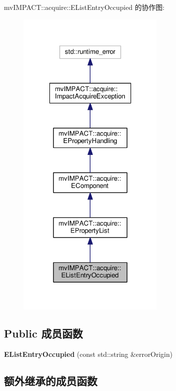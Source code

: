mv\+I\+M\+P\+A\+C\+T\+:\+:acquire\+:\+:E\+List\+Entry\+Occupied 的协作图\+:
\nopagebreak
\begin{figure}[H]
\begin{center}
\leavevmode
\includegraphics[width=202pt]{classmv_i_m_p_a_c_t_1_1acquire_1_1_e_list_entry_occupied__coll__graph}
\end{center}
\end{figure}
\subsection*{Public 成员函数}
\begin{DoxyCompactItemize}
\item 
\hypertarget{classmv_i_m_p_a_c_t_1_1acquire_1_1_e_list_entry_occupied_a71d053bc8bdde9d8ec842c8518ace189}{{\bfseries E\+List\+Entry\+Occupied} (const std\+::string \&error\+Origin)}\label{classmv_i_m_p_a_c_t_1_1acquire_1_1_e_list_entry_occupied_a71d053bc8bdde9d8ec842c8518ace189}

\end{DoxyCompactItemize}
\subsection*{额外继承的成员函数}


